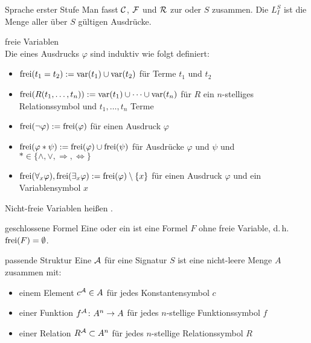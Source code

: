 \begin{Def}{Sprache erster Stufe}
    Man fasst $\mathcal{C}$, $\mathcal{F}$ und $\mathcal{R}$ zur  oder  $S$ zusammen.
    Die  $L_I^S$
    ist die Menge aller über $S$ gültigen Ausdrücke.
\end{Def}

\linie
\pagebreak

\begin{Def}{freie Variablen}\\
    Die  eines Ausdrucks $\varphi$ sind
    induktiv wie folgt definiert:
    \begin{itemize}
        \item
        $\text{frei}(t_1 = t_2) := \text{var}(t_1) \cup \text{var}(t_2)$ für Terme $t_1$ und $t_2$
        
        \item
        $\text{frei}(R(t_1, \dotsc, t_n)) := \text{var}(t_1) \cup \dotsb \cup \text{var}(t_n)$ für
        $R$ ein $n$-stelliges Relationssymbol und $t_1, \dotsc, t_n$ Terme
        
        \item
        $\text{frei}(\lnot \varphi) := \text{frei}(\varphi)$ für einen Ausdruck $\varphi$
        
        \item
        $\text{frei}(\varphi \ast \psi) := \text{frei}(\varphi) \cup \text{frei}(\psi)$ für Ausdrücke $\varphi$ und
        $\psi$ und $\ast \in \{\land, \lor, \Rightarrow, \Leftrightarrow\}$
        
        \item
        $\text{frei}(\forall_x \varphi), \text{frei}(\exists_x \varphi) := \text{frei}(\varphi) \setminus \{x\}$
        für einen Ausdruck $\varphi$ und ein Variablensymbol $x$
    \end{itemize}
    Nicht-freie Variablen heißen .
\end{Def}

\begin{Def}{geschlossene Formel}
    Eine  oder ein  ist eine Formel $F$
    ohne freie Variable, d.\,h. $\text{frei}(F) = \emptyset$.
\end{Def}

\linie

\begin{Def}{passende Struktur}
    Eine  $\mathcal{A}$ für eine Signatur $S$
    ist eine nicht-leere Menge $A$ zusammen mit:
    \begin{itemize}
        \item
        einem Element $c^{\mathcal{A}} \in A$ für jedes Konstantensymbol $c$
        
        \item
        einer Funktion $f^{\mathcal{A}}\colon A^n \rightarrow A$ für jedes $n$-stellige Funktionssymbol $f$
        
        \item
        einer Relation $R^{\mathcal{A}} \subset A^n$ für jedes $n$-stellige Relationssymbol $R$
    \end{itemize}
\end{Def}

